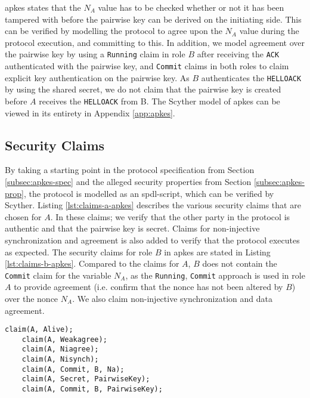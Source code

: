 \gls{apkes} states that the $N_A$ value has to be checked whether or not it has been tampered with before the pairwise key can be derived on the initiating side. This can be verified by modelling the protocol to agree upon the $N_A$ value during the protocol execution, and committing to this. In addition, we model agreement over the pairwise key by using a \texttt{Running} claim in role $B$ after receiving the \texttt{ACK} authenticated with the pairwise key, and \texttt{Commit} claims in both roles to claim explicit key authentication on the pairwise key. As $B$ authenticates the \texttt{HELLOACK} by using the shared secret, we do not claim that the pairwise key is created before $A$ receives the \texttt{HELLOACK} from B. The Scyther model of \gls{apkes} can be viewed in its entirety in Appendix \ref{app:apkes}.

\subsection{Security Claims}

By taking a starting point in the protocol specification from Section \ref{subsec:apkes-spec} and the alleged security properties from Section \ref{subsec:apkes-prop}, the protocol is modelled as an \gls{spdl}-script, which can be verified by Scyther. Listing \ref{lst:claims-a-apkes} describes the various security claims that are chosen for $A$. In these claims; we verify that the other party in the protocol is authentic and that the pairwise key is secret. Claims for non-injective synchronization and agreement is also added to verify that the protocol executes as expected. The security claims for role $B$ in \gls{apkes} are stated in Listing \ref{lst:claims-b-apkes}. Compared to the claims for $A$, $B$ does not contain the \texttt{Commit} claim for the variable $N_A$, as the \texttt{Running}, \texttt{Commit} approach is used in role $A$ to provide agreement (i.e. confirm that the nonce has not been altered by $B$) over the nonce $N_A$. We also claim non-injective synchronization and data agreement.\\

\begin{lstlisting}[caption={Security claims for role A in APKES.}, label={lst:claims-a-apkes}, style=code-listings]
	claim(A, Alive);
	claim(A, Weakagree);
	claim(A, Niagree);
	claim(A, Nisynch);
	claim(A, Commit, B, Na);
	claim(A, Secret, PairwiseKey);
	claim(A, Commit, B, PairwiseKey);
\end{lstlisting}


